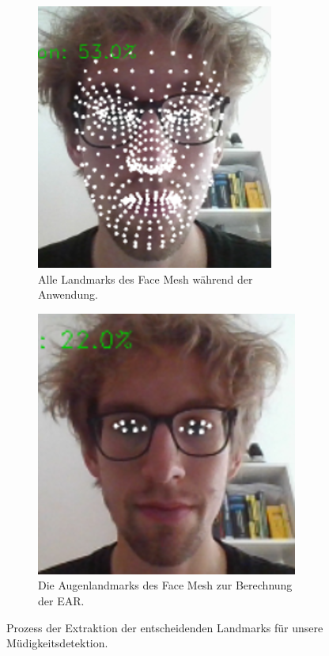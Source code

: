 \begin{figure}
\begin{subfigure}{0.3\textwidth}
        \includegraphics[width=\linewidth]{images/MPFaceMesh2.png}
        \caption{Alle Landmarks des Face Mesh während der Anwendung.}
        \label{fig:MPFaceMesh2}
    \end{subfigure}
    \hfill
    \begin{subfigure}{0.3\textwidth}
        \includegraphics[width=\linewidth]{images/MPFaceMesh3.png}
        \caption{Die Augenlandmarks des Face Mesh zur Berechnung der EAR.}
        \label{fig:MPFaceMesh3}
    \end{subfigure}
    \caption{Prozess der Extraktion der entscheidenden Landmarks für unsere Müdigkeitsdetektion.}
    \label{fig:MPFaceMesh}
\end{figure}

